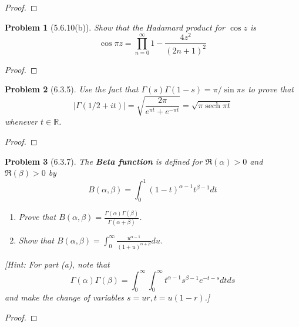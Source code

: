 \documentclass[10pt]{article}
\newcommand{\sk}{\vskip 10mm}
\newcommand{\bb}[1]{\mathbb{#1}}
\DeclareMathOperator{\sech}{sech}
\theoremstyle{plain}
\newtheorem{problem}{Problem}
\theoremstyle{remark}
\begin{document}
\begin{proof}
  
\end{proof}

\sk

\begin{problem}[5.6.10(b)]
  Show that the Hadamard product for $\cos z$ is 
  \[
    \cos\pi z=\prod_{n=0}^\infty 1-\frac{4z^2}{(2n+1)^2}
  \]
\end{problem}

\begin{proof}
  
\end{proof}

\sk

\begin{problem}[6.3.5]
  Use the fact that $\Gamma(s)\Gamma(1-s)=\pi/\sin\pi s$ to prove that
  \[
    |\Gamma(1/2+it)|=\sqrt{\frac{2\pi}{e^{\pi t}+e^{-\pi t}}}=\sqrt{\pi\sech{\pi t}}
  \]
  whenever $t\in \bb{R}$.
\end{problem}

\begin{proof}
  
\end{proof}

\sk

\begin{problem}[6.3.7]
  The \textbf{Beta function} is defined for $\Re(\alpha)>0$ and
  $\Re(\beta)>0$ by
  \[
    B(\alpha,\beta)=\int_0^1(1-t)^{\alpha-1}t^{\beta-1}dt
  \]
  \begin{enumerate}
  \item[(a)] Prove that
    $B(\alpha,\beta)=\frac{\Gamma(\alpha)\Gamma(\beta)}{\Gamma(\alpha+\beta)}$.
  \item[(b)] Show that
    $B(\alpha,\beta)=\int_0^\infty\frac{u^{\alpha-1}}{(1+u)^{\alpha+\beta}}du$.
  \end{enumerate}
  [Hint: For part (a), note that
  \[
    \Gamma(\alpha)\Gamma(\beta)=\int_0^\infty\int_0^\infty t^{\alpha-1}s^{\beta-1}e^{-t-s}dtds
  \]
  and make the change of variables $s=ur,t=u(1-r)$.]
\end{problem}

\begin{proof}
  
\end{proof}

\sk
\end{document}
